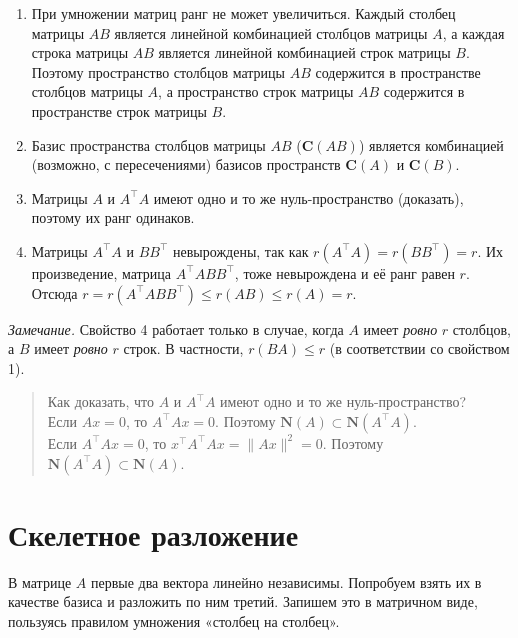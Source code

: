 \documentclass[11pt,a4paper]{article}
\providecommand{\tightlist}{%
      \setlength{\itemsep}{0pt}\setlength{\parskip}{0pt}}
\begin{document}
\begin{enumerate}
\def\labelenumi{\arabic{enumi}.}
\tightlist
\item
  При умножении матриц ранг не может увеличиться. Каждый столбец матрицы
  \(AB\) является линейной комбинацией столбцов матрицы \(A\), а каждая
  строка матрицы \(AB\) является линейной комбинацией строк матрицы
  \(B\). Поэтому пространство столбцов матрицы \(AB\) содержится в
  пространстве столбцов матрицы \(A\), а пространство строк матрицы
  \(AB\) содержится в пространстве строк матрицы \(B\).
\item
  Базис пространства столбцов матрицы \(AB\) (\(\mathbf{C}(AB)\))
  является комбинацией (возможно, с пересечениями) базисов пространств
  \(\mathbf{C}(A)\) и \(\mathbf{C}(B)\).
\item
  Матрицы \(A\) и \(A^\top A\) имеют одно и то же нуль-пространство
  (доказать), поэтому их ранг одинаков.
\item
  Матрицы \(A^\top A\) и \(BB^\top\) невырождены, так как
  \(r(A^\top A) = r(BB^\top) = r\). Их произведение, матрица
  \(A^\top A BB^\top\), тоже невырождена и её ранг равен \(r\). Отсюда
  \(r = r(A^\top A BB^\top) \le r(AB) \le r(A) = r\).
\end{enumerate}

\emph{Замечание.} Свойство 4 работает только в случае, когда \(A\) имеет
\emph{ровно} \(r\) столбцов, а \(B\) имеет \emph{ровно} \(r\) строк. В
частности, \(r(BA) \le r\) (в соответствии со свойством 1).

    \begin{quote}
Как доказать, что \(A\) и \(A^\top A\) имеют одно и то же
нуль-пространство?\\
Если \(Ax=0\), то \(A^\top Ax = 0\). Поэтому
\(\mathbf{N}(A) \subset \mathbf{N}(A^\top A)\).\\
Если \(A^\top Ax = 0\), то \(x^\top A^\top Ax = \|Ax\|^2 = 0\). Поэтому
\(\mathbf{N}(A^\top A) \subset \mathbf{N}(A)\).
\end{quote}

    \hypertarget{ux441ux43aux435ux43bux435ux442ux43dux43eux435-ux440ux430ux437ux43bux43eux436ux435ux43dux438ux435}{%
\section{Скелетное
разложение}\label{ux441ux43aux435ux43bux435ux442ux43dux43eux435-ux440ux430ux437ux43bux43eux436ux435ux43dux438ux435}}

В матрице \(A\) первые два вектора линейно независимы. Попробуем взять
их в качестве базиса и разложить по ним третий. Запишем это в матричном
виде, пользуясь правилом умножения «столбец на столбец».
\end{document}

